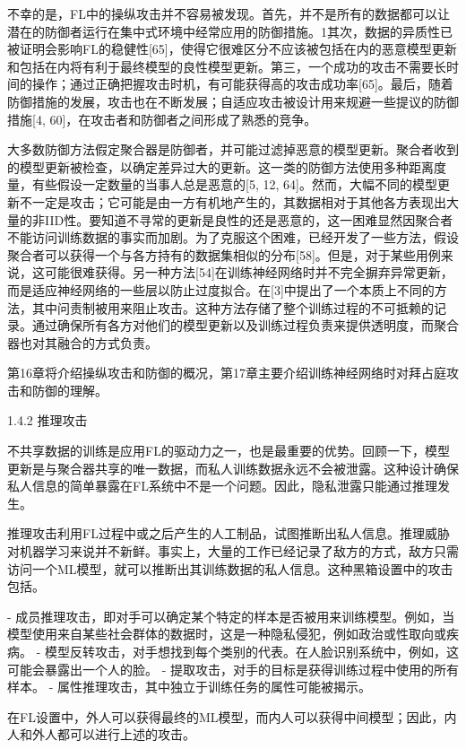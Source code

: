 不幸的是，FL中的操纵攻击并不容易被发现。首先，并不是所有的数据都可以让潜在的防御者运行在集中式环境中经常应用的防御措施。1其次，数据的异质性已被证明会影响FL的稳健性[65]，使得它很难区分不应该被包括在内的恶意模型更新和包括在内将有利于最终模型的良性模型更新。第三，一个成功的攻击不需要长时间的操作；通过正确把握攻击时机，有可能获得高的攻击成功率[65]。最后，随着防御措施的发展，攻击也在不断发展；自适应攻击被设计用来规避一些提议的防御措施[4, 60]，在攻击者和防御者之间形成了熟悉的竞争。

大多数防御方法假定聚合器是防御者，并可能过滤掉恶意的模型更新。聚合者收到的模型更新被检查，以确定差异过大的更新。这一类的防御方法使用多种距离度量，有些假设一定数量的当事人总是恶意的[5, 12, 64]。然而，大幅不同的模型更新不一定是攻击；它可能是由一方有机地产生的，其数据相对于其他各方表现出大量的非IID性。要知道不寻常的更新是良性的还是恶意的，这一困难显然因聚合者不能访问训练数据的事实而加剧。为了克服这个困难，已经开发了一些方法，假设聚合者可以获得一个与各方持有的数据集相似的分布[58]。但是，对于某些用例来说，这可能很难获得。另一种方法[54]在训练神经网络时并不完全摒弃异常更新，而是适应神经网络的一些层以防止过度拟合。在[3]中提出了一个本质上不同的方法，其中问责制被用来阻止攻击。这种方法存储了整个训练过程的不可抵赖的记录。通过确保所有各方对他们的模型更新以及训练过程负责来提供透明度，而聚合器也对其融合的方式负责。

第16章将介绍操纵攻击和防御的概况，第17章主要介绍训练神经网络时对拜占庭攻击和防御的理解。

1.4.2 推理攻击

不共享数据的训练是应用FL的驱动力之一，也是最重要的优势。回顾一下，模型更新是与聚合器共享的唯一数据，而私人训练数据永远不会被泄露。这种设计确保私人信息的简单暴露在FL系统中不是一个问题。因此，隐私泄露只能通过推理发生。

推理攻击利用FL过程中或之后产生的人工制品，试图推断出私人信息。推理威胁对机器学习来说并不新鲜。事实上，大量的工作已经记录了敌方的方式，敌方只需访问一个ML模型，就可以推断出其训练数据的私人信息。这种黑箱设置中的攻击包括。

- 成员推理攻击，即对手可以确定某个特定的样本是否被用来训练模型。例如，当模型使用来自某些社会群体的数据时，这是一种隐私侵犯，例如政治或性取向或疾病。
- 模型反转攻击，对手想找到每个类别的代表。在人脸识别系统中，例如，这可能会暴露出一个人的脸。
- 提取攻击，对手的目标是获得训练过程中使用的所有样本。
- 属性推理攻击，其中独立于训练任务的属性可能被揭示。

在FL设置中，外人可以获得最终的ML模型，而内人可以获得中间模型；因此，内人和外人都可以进行上述的攻击。

